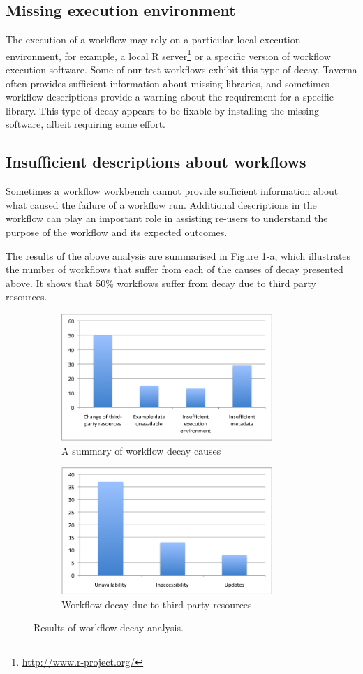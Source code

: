 \subsection{Missing execution environment}
The execution of a workflow may rely on a particular local execution environment, for example, a local R server\footnote{\url{http://www.r-project.org/}} or a specific version of workflow execution software. Some of our test workflows exhibit this type of decay. Taverna often provides sufficient information about missing libraries, and sometimes workflow descriptions provide a warning about the requirement for a specific library. This type of decay appears to be fixable by installing the missing software, albeit requiring some effort.

\subsection{Insufficient descriptions about workflows}
Sometimes a workflow workbench cannot provide sufficient information about what caused the failure of a workflow run. Additional descriptions in the workflow can play an important role in assisting re-users to understand the purpose of the workflow and its expected outcomes.



The results of the above analysis are summarised in Figure \ref{fig:decay-analysis}-a, which illustrates the number of workflows that suffer from each of the causes of decay presented above. It shows that {50\%} workflows suffer from decay due to third party resources. 

\begin{figure}[ht]
\centering
\begin{subfigure}[t]{8.25cm}
  \includegraphics[width=8cm]{./Figures/decay_analysis_chart1-v2.png}
  \caption{A summary of workflow decay causes}
\end{subfigure}
\begin{subfigure}[t]{8.25cm}
  \includegraphics[width=8cm]{./Figures/decay_analysis_chart2-v2.png}
  \caption{Workflow decay due to third party resources}
\end{subfigure}
\caption{Results of workflow decay analysis.}
\label{fig:decay-analysis}
\end{figure}


